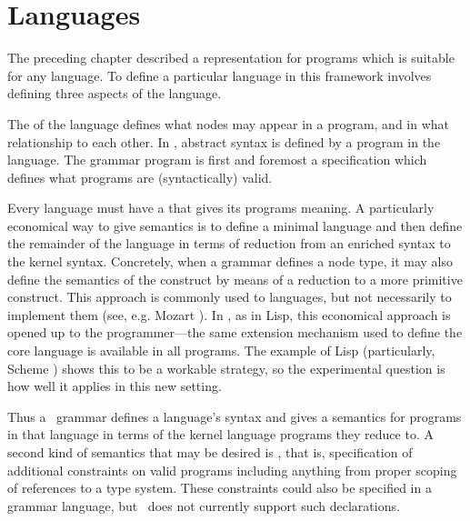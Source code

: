 \chapter{Languages}
\label{languages}
The preceding chapter described a representation for programs which is suitable for any language. To define a particular language in this framework involves defining three aspects of the language.

The  of the language defines what nodes may appear in a program, and in what relationship to each other. In \Meta, abstract syntax is defined by a program in the  language. The grammar program is first and foremost a specification which defines what programs are (syntactically) valid. 

Every language must have a  that gives its programs meaning. 
A particularly economical way to give semantics is to define a minimal  language and then define the remainder of the language in terms of reduction from an enriched syntax to the kernel syntax. Concretely, when a grammar defines a node type, it may also define the semantics of the construct by means of a reduction to a more primitive construct. This approach is commonly used to  languages, but not necessarily to implement them (see, e.g. Mozart \cite{mozart}). In \Meta, as in Lisp, this economical approach is opened up to the programmer---the same extension mechanism used to define the core language is available in all programs. The example of Lisp (particularly, Scheme \cite{scheme}) shows this to be a workable strategy, so the experimental question is how well it applies in this new setting.

Thus a \Meta\ grammar defines a language's syntax and gives a semantics for programs in that language in terms of the kernel language programs they reduce to. A second kind of semantics that may be desired is , that is, specification of additional constraints on valid programs including anything from proper scoping of references to a type system. These constraints could also be specified in a grammar language, but \Meta\ does not currently support such declarations. 

